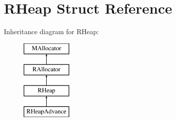 \hypertarget{struct_r_heap}{}\section{R\+Heap Struct Reference}
\label{struct_r_heap}
Inheritance diagram for R\+Heap\+:\begin{figure}[H]
\begin{center}
\leavevmode
\includegraphics[height=4.000000cm]{struct_r_heap}
\end{center}
\end{figure}
